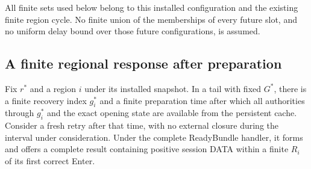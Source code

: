 All finite sets used below belong to this installed configuration and
the existing finite region cycle. No finite union of the memberships
of every future slot, and no uniform delay bound over those future
configurations, is assumed.

\subsection{A finite regional response after preparation}
\label{sec:v35-regional-response}
\begin{proposition}
\label{prop:v35-regional-response}
Fix $r^*$ and a region $i$ under its installed snapshot. In a tail with
fixed $G^*$, there is a finite recovery index $g_i^*$ and a finite
preparation time after which all authorities through $g_i^*$ and the
exact opening state are available from the persistent cache. Consider
a fresh retry after that time, with no external closure during the
interval under consideration. Under the complete ReadyBundle handler,
it forms and offers a complete result containing positive session DATA
within a finite $R_i$ of its first correct Enter.
\end{proposition}
